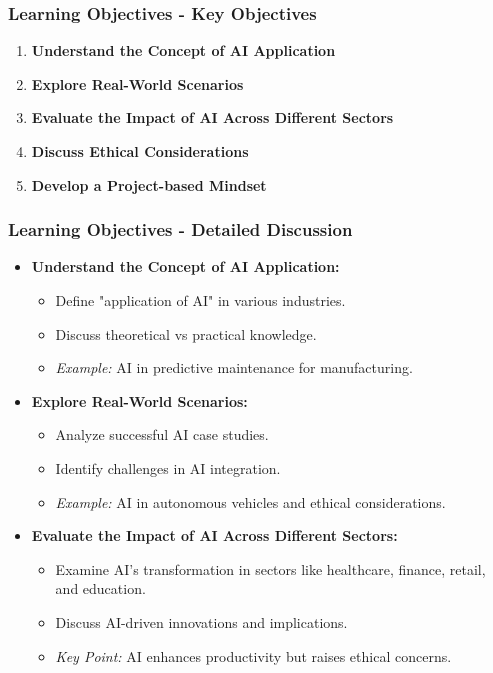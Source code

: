 \documentclass[aspectratio=169]{beamer}
\begin{document}
\begin{frame}[fragile]
    \frametitle{Learning Objectives - Key Objectives}
    \begin{enumerate}
        \item \textbf{Understand the Concept of AI Application}
        \item \textbf{Explore Real-World Scenarios}
        \item \textbf{Evaluate the Impact of AI Across Different Sectors}
        \item \textbf{Discuss Ethical Considerations}
        \item \textbf{Develop a Project-based Mindset}
    \end{enumerate}
\end{frame}

\begin{frame}[fragile]
    \frametitle{Learning Objectives - Detailed Discussion}
    \begin{itemize}
        \item \textbf{Understand the Concept of AI Application:}
        \begin{itemize}
            \item Define "application of AI" in various industries.
            \item Discuss theoretical vs practical knowledge.
            \item \textit{Example:} AI in predictive maintenance for manufacturing.
        \end{itemize}

        \item \textbf{Explore Real-World Scenarios:}
        \begin{itemize}
            \item Analyze successful AI case studies.
            \item Identify challenges in AI integration.
            \item \textit{Example:} AI in autonomous vehicles and ethical considerations.
        \end{itemize}
        
        \item \textbf{Evaluate the Impact of AI Across Different Sectors:}
        \begin{itemize}
            \item Examine AI's transformation in sectors like healthcare, finance, retail, and education.
            \item Discuss AI-driven innovations and implications.
            \item \textit{Key Point:} AI enhances productivity but raises ethical concerns.
        \end{itemize}
    \end{itemize}
\end{frame}
\end{document}
